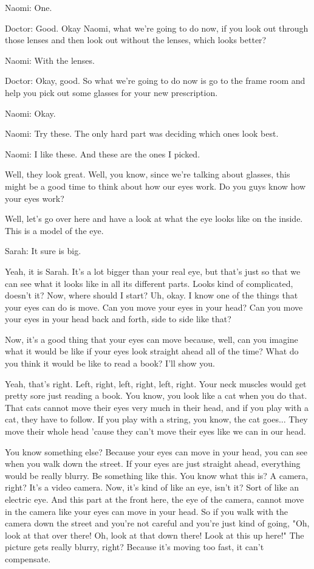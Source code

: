 Naomi: One.

Doctor: Good. Okay Naomi, what we're going to do now, if you look out through those lenses and then look out without the lenses, which looks better?

Naomi: With the lenses.

Doctor: Okay, good. So what we're going to do now is go to the frame room and help you pick out some glasses for your new prescription.

Naomi: Okay.

Naomi: Try these. The only hard part was deciding which ones look best.

Naomi: I like these. And these are the ones I picked.

Well, they look great. Well, you know, since we're talking about glasses, this might be a good time to think about how our eyes work. Do you guys know how your eyes work?

Well, let's go over here and have a look at what the eye looks like on the inside. This is a model of the eye.

Sarah: It sure is big.

Yeah, it is Sarah. It's a lot bigger than your real eye, but that's just so that we can see what it looks like in all its different parts. Looks kind of complicated, doesn't it? Now, where should I start? Uh, okay. I know one of the things that your eyes can do is move. Can you move your eyes in your head? Can you move your eyes in your head back and forth, side to side like that?

Now, it's a good thing that your eyes can move because, well, can you imagine what it would be like if your eyes look straight ahead all of the time? What do you think it would be like to read a book? I'll show you.

Yeah, that's right. Left, right, left, right, left, right. Your neck muscles would get pretty sore just reading a book. You know, you look like a cat when you do that. That cats cannot move their eyes very much in their head, and if you play with a cat, they have to follow. If you play with a string, you know, the cat goes... They move their whole head 'cause they can't move their eyes like we can in our head.

You know something else? Because your eyes can move in your head, you can see when you walk down the street. If your eyes are just straight ahead, everything would be really blurry. Be something like this. You know what this is? A camera, right? It's a video camera. Now, it's kind of like an eye, isn't it? Sort of like an electric eye. And this part at the front here, the eye of the camera, cannot move in the camera like your eyes can move in your head. So if you walk with the camera down the street and you're not careful and you're just kind of going, "Oh, look at that over there! Oh, look at that down there! Look at this up here!" The picture gets really blurry, right? Because it's moving too fast, it can't compensate.

